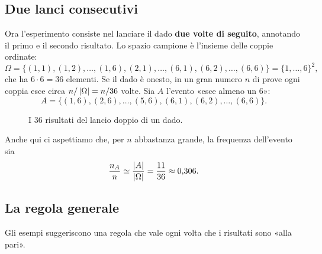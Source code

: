 \subsection{Due lanci consecutivi}

Ora l'esperimento consiste nel lanciare il dado \textbf{due volte di seguito}, annotando il primo e il secondo
risultato. Lo spazio campione è l'insieme delle coppie ordinate:
\[ \Omega = \{(1,1), (1,2), \ldots, (1,6), (2,1), \ldots, (6,1), (6,2), \ldots, (6,6)\} = \{1, \ldots, 6\}^2 , \]
che ha $6 \cdot 6 = 36$ elementi. Se il dado è onesto, in un gran numero $n$ di prove ogni coppia esce circa
$n / \left\lvert \Omega \right\rvert = n/36$ volte. Sia $A$ l'evento «esce almeno un 6»:
\[ A = \{(1,6), (2,6), \ldots, (5,6), (6,1), (6,2), \ldots, (6,6)\} . \]

\begin{figure}[H]
\centering
{}
\caption{I 36 risultati del lancio doppio di un dado.}
\end{figure}

Anche qui ci aspettiamo che, per $n$ abbastanza grande, la frequenza dell'evento sia
\[ \frac{n_A}{n} \simeq \frac{\left\lvert A \right\rvert}{\left\lvert \Omega \right\rvert} = \frac{11}{36} \approx 0{,}306 . \]

\subsection{La regola generale}

Gli esempi suggeriscono una regola che vale ogni volta che i risultati sono «alla pari».

